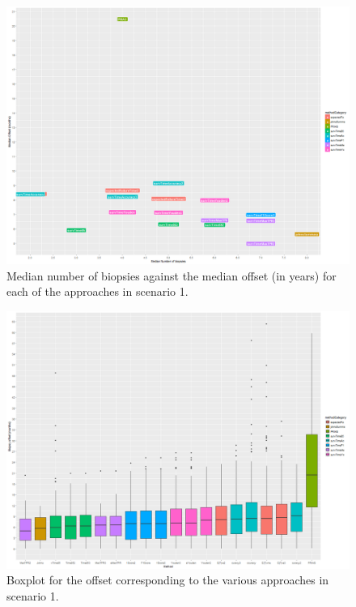 \begin{figure}[H]
\centering
\captionsetup{justification=centering}
\includegraphics[width=\textwidth]{sim_study_res_sc_10_sh_7pt5/median_offsetvsnb.png}
\caption{\label{fig : sc_10_sh_7pt5_median_offsetvsnb}Median number of biopsies against the median offset (in years) for each of the approaches in scenario 1.}
\end{figure}

\begin{figure}[H]
\centering
\captionsetup{justification=centering}
\includegraphics[width=\textwidth]{sim_study_res_sc_10_sh_7pt5/offset_boxplot.png}
\caption{\label{fig : sc_10_sh_7pt5_offset_boxplot} Boxplot for the offset corresponding to the various approaches in scenario 1.}
\end{figure}

